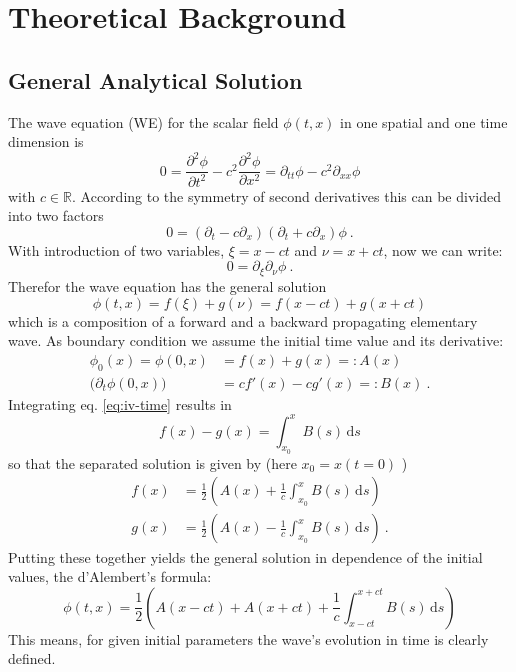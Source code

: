 \section{Theoretical Background}
\subsection{General Analytical Solution}

The wave equation (WE) for the scalar field $\phi (t,x) $ in one spatial and one time dimension is
\begin{equation}
	0 =  \frac{\partial^2 \phi}{\partial t^2}- c^2 \frac{\partial^2 \phi}{\partial x^2} = \partial_{tt} \phi -c^2 \partial_{xx} \phi
	\label{eq:we}
\end{equation}
with $c \in \mathbb{R}$.
According to the symmetry of second derivatives this can be divided into two factors
\begin{equation}
	0 = \left(\partial_{t} - c \partial_{x} \right)
	\left( \partial_{t} + c \partial_{x} \right)  \phi ~.
\end{equation}
With introduction of two variables, $\xi = x-ct $ and $\nu= x+ct$, now we can write:
\begin{equation}
	0 = \partial_{\xi}\partial_{\nu} \phi ~.
\end{equation}
Therefor the wave equation has the general solution
\begin{equation}
	\phi(t,x) =f(\xi) + g(\nu)=  f(x-ct) + g(x+ct)
\end{equation}
which is a composition of a forward and a backward propagating elementary wave.
As boundary condition we assume the initial time value and its derivative:
\begin{align}
	\phi_0(x) = \phi(0,x) &= f(x) + g(x) =: A(x) \\
	\big(\partial_t \phi(0,x)\big) &= cf'(x) - cg'(x) =: B(x)~.
	\label{eq:iv-time}
\end{align}
Integrating eq. \ref{eq:iv-time} results in
\begin{equation}
	f(x)-g(x)= \int_{x_0}^x B(s)\,\mathrm{d}s
\end{equation}
so that the separated solution is given by (here $x_0 = x(t=0)$ )
\begin{align}
	f(x) & =\frac{1}{2}
	\left( A(x)+\frac{1}{c}\int_{x_0}^x B(s)\,\mathrm{d}s \right)\\
	g(x) & = \frac{1}{2}
	\left( A(x)-\frac{1}{c} \int_{x_0}^x B(s)\,\mathrm{d}s \right) ~.
\end{align}
Putting these together yields the general solution in dependence of the initial values, the d'Alembert's formula:
\begin{equation}
	\phi(t,x) =\frac{1}{2}
	\left( A(x-ct) +A(x+ct) + \frac{1}{c}\int_{x-ct}^{x+ct} B(s)\,
	\mathrm{d}s \right)
\end{equation}
This means, for given initial parameters the wave's evolution in time is clearly defined.


